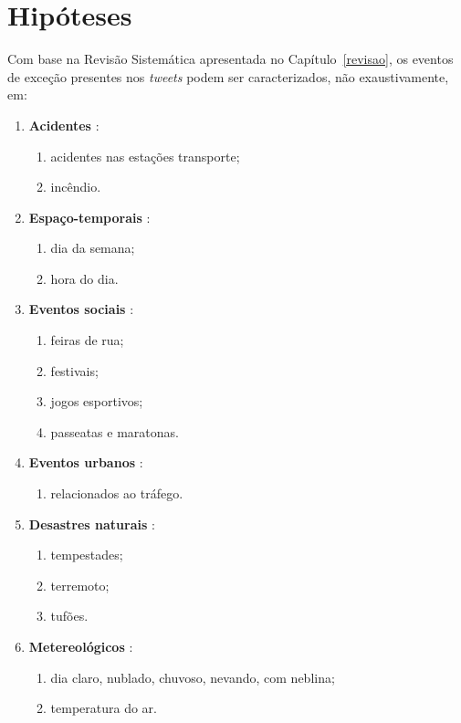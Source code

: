 \documentclass[
	12pt,				%
	oneside,			%
	a4paper,			%
	english,			%
	brazil				%
	]{abntex2ppgsi}
\begin{document}
{\section{Hipóteses}
\label{hipoteses}

Com base na Revisão Sistemática apresentada no Capítulo~\ref{revisao}, os eventos de exceção presentes nos \textit{tweets} podem ser caracterizados, não exaustivamente, em:

\begin{enumerate}
\item \textbf{Acidentes} \cite{Itoh2016}:
\begin{enumerate}
\item acidentes nas estações transporte;
\item incêndio.
\end{enumerate}

\item \textbf{Espaço-temporais}  \cite{Chen2016}:
\begin{enumerate}
\item dia da semana;
\item hora do dia.
\end{enumerate}

\item \textbf{Eventos sociais} \cite{Chen2016, Lecue2014, Gal-Tzur2014, Itoh2016}:
\begin{enumerate}
\item feiras de rua;
\item festivais;
\item jogos esportivos;
\item passeatas e maratonas.
\end{enumerate}

\item \textbf{Eventos urbanos} \cite{Chen2016, Lecue2014}:
\begin{enumerate}
\item relacionados ao tráfego.
\end{enumerate}

\item \textbf{Desastres naturais} \cite{Itoh2016}:
\begin{enumerate}
\item tempestades;
\item terremoto;
\item tufões.
\end{enumerate}

\item \textbf{Metereológicos} \cite{Chen2016}:
\begin{enumerate}
\item dia claro, nublado, chuvoso, nevando, com neblina;
\item temperatura do ar.
\end{enumerate}


\end{enumerate}}
\end{document}
